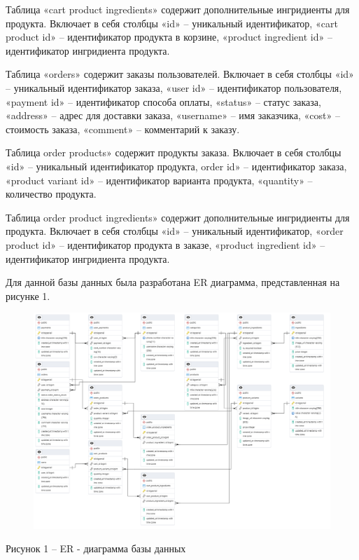 \documentclass[a4paper,14pt]{extarticle}
\begin{document}
  Таблица «cart product ingredients» содержит дополнительные ингридиенты для продукта. Включает в себя столбцы «id» -- уникальный идентификатор, «cart product id» -- идентификатор продукта в корзине, «product ingredient id» -- идентификатор ингридиента продукта.

  Таблица «orders» содержит заказы пользователей. Включает в себя столбцы «id» -- уникальный идентификатор заказа, «user id» -- идентификатор пользователя, «payment id» -- идентификатор способа оплаты, «status» -- статус заказа, «address» -- адрес для доставки заказа, «username» -- имя заказчика, «cost» -- стоимость заказа, «comment» -- комментарий к заказу.

  Таблица order products» содержит продукты заказа. Включает в себя столбцы «id» -- уникальный идентификатор продукта, order id» -- идентификатор заказа, «product variant id» -- идентификатор варианта продукта, «quantity» -- количество продукта.

  Таблица order product ingredients» содержит дополнительные ингридиенты для продукта. Включает в себя столбцы «id» -- уникальный идентификатор, «order product id» -- идентификатор продукта в заказе, «product ingredient id» -- идентификатор ингридиента продукта.

  Для данной базы данных была разработана ER диаграмма, представленная на рисунке 1.

  \pagebreak
  \begin{figure}[h]
    \centering
    \includegraphics[width=1\linewidth]{img/er}
  \end{figure}
  \begin{center}
    Рисунок 1 – ER - диаграмма базы данных
  \end{center}
\end{document}
